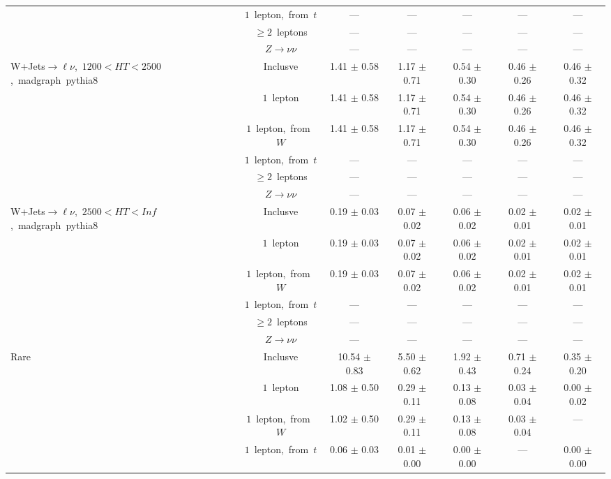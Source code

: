 \documentclass{article}
\begin{document}
\begin{longtable}{|l|c|c|c|c|c|c|}
 & $1$~lepton,~from~$t$  & ---  & ---  & ---  & ---  & --- \\* 
 & $\ge2$~leptons  & ---  & ---  & ---  & ---  & --- \\* 
 & $Z\rightarrow\nu\nu$  & ---  & ---  & ---  & ---  & --- \\* 
\hline 
\multirow{6}{*}{W+Jets$\rightarrow\ell\nu$,~$1200<HT<2500$,~madgraph~pythia8} & Inclusve  & 1.41 $\pm$ 0.58  & 1.17 $\pm$ 0.71  & 0.54 $\pm$ 0.30  & 0.46 $\pm$ 0.26  & 0.46 $\pm$ 0.32 \\* 
 & $1$~lepton  & 1.41 $\pm$ 0.58  & 1.17 $\pm$ 0.71  & 0.54 $\pm$ 0.30  & 0.46 $\pm$ 0.26  & 0.46 $\pm$ 0.32 \\* 
 & $1$~lepton,~from~$W$  & 1.41 $\pm$ 0.58  & 1.17 $\pm$ 0.71  & 0.54 $\pm$ 0.30  & 0.46 $\pm$ 0.26  & 0.46 $\pm$ 0.32 \\* 
 & $1$~lepton,~from~$t$  & ---  & ---  & ---  & ---  & --- \\* 
 & $\ge2$~leptons  & ---  & ---  & ---  & ---  & --- \\* 
 & $Z\rightarrow\nu\nu$  & ---  & ---  & ---  & ---  & --- \\* 
\hline 
\multirow{6}{*}{W+Jets$\rightarrow\ell\nu$,~$2500<HT<Inf$,~madgraph~pythia8} & Inclusve  & 0.19 $\pm$ 0.03  & 0.07 $\pm$ 0.02  & 0.06 $\pm$ 0.02  & 0.02 $\pm$ 0.01  & 0.02 $\pm$ 0.01 \\* 
 & $1$~lepton  & 0.19 $\pm$ 0.03  & 0.07 $\pm$ 0.02  & 0.06 $\pm$ 0.02  & 0.02 $\pm$ 0.01  & 0.02 $\pm$ 0.01 \\* 
 & $1$~lepton,~from~$W$  & 0.19 $\pm$ 0.03  & 0.07 $\pm$ 0.02  & 0.06 $\pm$ 0.02  & 0.02 $\pm$ 0.01  & 0.02 $\pm$ 0.01 \\* 
 & $1$~lepton,~from~$t$  & ---  & ---  & ---  & ---  & --- \\* 
 & $\ge2$~leptons  & ---  & ---  & ---  & ---  & --- \\* 
 & $Z\rightarrow\nu\nu$  & ---  & ---  & ---  & ---  & --- \\* 
\hline 
\multirow{6}{*}{Rare} & Inclusve  & 10.54 $\pm$ 0.83  & 5.50 $\pm$ 0.62  & 1.92 $\pm$ 0.43  & 0.71 $\pm$ 0.24  & 0.35 $\pm$ 0.20 \\* 
 & $1$~lepton  & 1.08 $\pm$ 0.50  & 0.29 $\pm$ 0.11  & 0.13 $\pm$ 0.08  & 0.03 $\pm$ 0.04  & 0.00 $\pm$ 0.02 \\* 
 & $1$~lepton,~from~$W$  & 1.02 $\pm$ 0.50  & 0.29 $\pm$ 0.11  & 0.13 $\pm$ 0.08  & 0.03 $\pm$ 0.04  & --- \\* 
 & $1$~lepton,~from~$t$  & 0.06 $\pm$ 0.03  & 0.01 $\pm$ 0.00  & 0.00 $\pm$ 0.00  & ---  & 0.00 $\pm$ 0.00 \\* 

\end{longtable}
\end{document}
